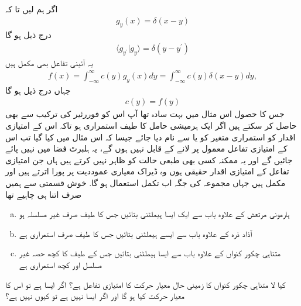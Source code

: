 اگر ہم  لیں تا کہ
\begin{align}
g_{y}(x) = \delta (x-y)
\end{align}
درج ذیل ہو گا
\begin{align}
\langle g_{y^{'}} | g_{y} \rangle = \delta (y-y^{'})
\end{align}
یہ آئینی تفاعل بھی مکمل ہیں
\begin{align}
f(x) = \int_{-\infty}^{\infty} c(y)g_{y}(x) dy = \int_{-\infty}^{\infty} c(y)\delta(x-y)dy,
\end{align}
جہاں درج ذیل ہو گا
\begin{align}
c(y) = f(y)
\end{align}
جس کا حصول اس مثال میں بہت سادہ تھا آپ اس کو فوررئیر کی ترکیب سے بھی حاصل کر سکتے ہیں
اگر ایک ہرمیشی حامل کا طیف استمراری ہو تاکہ اس کے امتیازی اقدار کو استمراری متغیر کو   یا  سے نام دیا جائے جیسا کہ اس مثال میں کیا گیا تب اس کے امتیازی تفاعل معمول پر لانے کے قابل نہیں ہوں گے، یہ ہلبرٹ فضا میں نہیں پائے جائیں گے اور یہ ممکنہ کسی بھی طبعی حالت کو ظاہر نہیں کرتے ہیں ہاں جن امتیازی تفاعل کے امتیازی اقدار حقیقی ہوں وہ ڈیراک معیاری عموددیت پر پورا اترتے ہیں اور مکمل ہیں جہاں مجموعہ کی جگہ اب تکمل استعمال ہو گا. خوش قسمتی سے ہمیں صرف اتنا ہی چاہیے تھا
\begin{enumerate}[a.]
\item  ہارمونی مرتعش کے علاوہ باب  سے ایک ایسا ہیملٹنی بتائیں جس کا طیف صرف غیر مسلسلہ ہو 
\item آذاد ذرہ کے علاوہ باب   سے ایسے ہیملٹنی بتائیں جس کا طیف صرف استمراری ہے 
\item متناہی چکور کنواں کے علاوہ باب   سے ایسا ہیملٹنی بتائیں جس کے طیف کا کچھ حصہ غیر مسلسل اور کچھ استمراری ہے 
\end{enumerate}
کیا لا متناہی چکور کنواں کا زمینی حال معیار حرکت کا  امتیازی تفاعل ہے؟ اگر ایسا ہے تو اس کا معیار حرکت کیا ہو گا اور اگر ایسا نہیں ہے تو کیوں نہیں ہے؟
